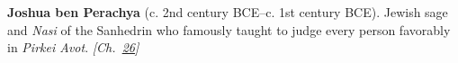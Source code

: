 \textbf{Joshua ben Perachya} (c. 2nd century BCE–c. 1st century BCE). Jewish sage and \emph{Nasi} of the Sanhedrin who famously taught to judge every person favorably in \emph{Pirkei Avot}. \emph{[Ch.~\hyperref[ch:jewishcalendar]{26}]}

